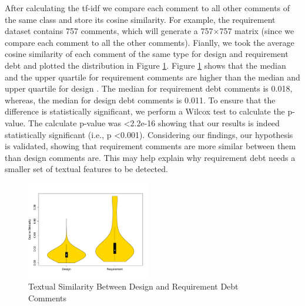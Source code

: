 
After calculating the tf-idf we compare each comment to all other comments of the same class and store its cosine similarity. For example, the requirement \SATD dataset contains 757 comments, which will generate a 757$\times$757 matrix (since we compare each comment to all the other comments). Fianlly, we took the average cosine similarity of each comment of the same type for design and requirement debt and plotted the distribution in Figure \ref{fig:textual_similarity}. Figure \ref{fig:textual_similarity} shows that the median and the upper quartile for requirement \SATD comments are higher than the median and upper quartile for design \SATD. The median for requirement debt comments is 0.018, whereas, the median for design debt comments is 0.011. To ensure that the difference is statistically significant, we perform a Wilcox test to calculate the p-value. The calculate p-value was \textless 2.2e-16 showing that our results is indeed statistically significant (i.e., p \textless 0.001). Considering our findings, our hypothesis is validated, showing that requirement \SATD comments are more similar between them than design \SATD comments are. This may help explain why requirement debt needs a smaller set of textual features to be detected.

\begin{figure}[t]
  \centering
  \includegraphics[width = 0.48\textwidth]{figures/textual_similarity_removing_stop_words.pdf}
  \vspace{-3mm}
  \caption{Textual Similarity Between Design and Requirement Debt Comments}
  \label{fig:textual_similarity}
\end{figure}

